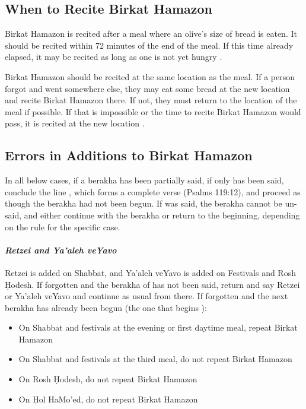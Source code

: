 \subsection{When to Recite Birkat Hamazon}

Birkat Hamazon is recited after a meal where an olive's size of bread is eaten. It should be recited within 72 minutes of the end of the meal.  If this time already elapsed, it may be recited as long as one is not yet hungry \parencite*[44:8]{Kitzur}.

Birkat Hamazon should be recited at the same location as the meal. If a person forgot and went somewhere else, they may eat some bread at the new location and recite Birkat Hamazon there. If not, they must return to the location of the meal if possible.  If that is impossible or the time to recite Birkat Hamazon would pass, it is recited at the new location \parencite*[44:9]{Kitzur}.

\subsection{Errors in Additions to Birkat Hamazon}

In all below cases, if a berakha has been partially said, if only  has been said, conclude the line , which forms a complete verse (Psalms 119:12), and proceed as though the berakha had not been begun.  If  was said, the berakha cannot be un-said, and either continue with the berakha or return to the beginning, depending on the rule for the specific case.

\paragraph{\textit{Retzei and Ya'aleh veYavo}} Retzei is added on Shabbat, and Ya'aleh veYavo is added on Festivals and Rosh \d{H}odesh.  If forgotten and the berakha of  has not been said, return and say Retzei or Ya'aleh veYavo and continue as usual from there.  If forgotten and the next berakha has already been begun (the one that begins ): \begin{itemize}
	\item On Shabbat and festivals at the evening or first daytime meal, repeat Birkat Hamazon
	\item On Shabbat and festivals at the third meal, do not repeat Birkat Hamazon
	\item On Rosh \d{H}odesh, do not repeat Birkat Hamazon
	\item On \d{H}ol HaMo'ed, do not repeat Birkat Hamazon
\end{itemize}

